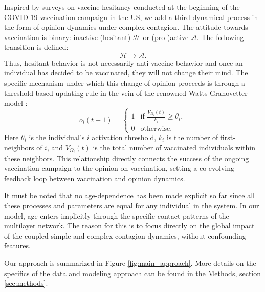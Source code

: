 \documentclass[
 reprint,
 amsmath,amssymb,
 aps,
]{revtex4-2}
\begin{document}
Inspired by surveys on vaccine hesitancy conducted at the beginning of the COVID-19 vaccination campaign in the US, we add a third dynamical process in the form of opinion dynamics under complex contagion. The attitude towards vaccination is binary: inactive (hesitant) $\mathcal{H}$ or (pro-)active $\mathcal{A}$. The following transition is defined:
\begin{equation}
\mathcal{H}\xrightarrow{}\mathcal{A}.
\end{equation}
Thus, hesitant behavior is not necessarily anti-vaccine behavior and once an individual has decided to be vaccinated, they will not change their mind. The specific mechanism under which this change of opinion proceeds is through a threshold-based updating rule in the vein of the renowned Watts-Granovetter model \cite{watts2007influentials}:
\begin{equation}
o_i(t+1)=
    \begin{cases}
        1 & \text{if } \frac{V_{\Omega_i}(t)}{k_i}\geq\theta_i,\\
        0 & \text{otherwise}.
    \end{cases}
\end{equation}
Here $\theta_i$ is the individual's $i$ activation threshold, $k_i$ is the number of first-neighbors of $i$, and $V_{\Omega_i}(t)$ is the total number of vaccinated individuals within these neighbors. This relationship directly connects the success of the ongoing vaccination campaign to the opinion on vaccination, setting a co-evolving feedback loop between vaccination and opinion dynamics. 

It must be noted that no age-dependence has been made explicit so far since all these processes and parameters are equal for any individual in the system. In our model, age enters implicitly through the specific contact patterns of the multilayer network. The reason for this is to focus directly on the global impact of the coupled simple and complex contagion dynamics, without confounding features.

Our approach is summarized in Figure \ref{fig:main_approach}. More details on the specifics of the data and modeling approach can be found in the Methods, section \ref{sec:methods}.
\end{document}
